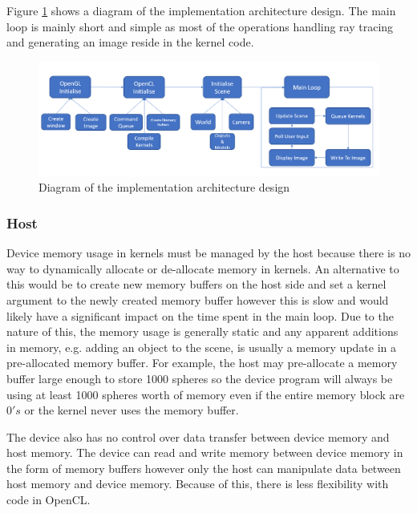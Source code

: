 \documentclass[final]{cmpreport}
\begin{document}
Figure \ref{arch_design} shows a diagram of the implementation architecture design. The main loop is mainly short and simple as most of the operations handling ray tracing and generating an image reside in the kernel code.

\begin{figure}
    \centering
    \includegraphics[width=\textwidth]{img/architecture_diagram.png}
    \caption{Diagram of the implementation architecture design}
    \label{arch_design}
\end{figure}

\subsubsection{Host}

Device memory usage in kernels must be managed by the host because there is no way to dynamically allocate or de-allocate memory in kernels. An alternative to this would be to create new memory buffers on the host side and set a kernel argument to the newly created memory buffer however this is slow and would likely have a significant impact on the time spent in the main loop. Due to the nature of this, the memory usage is generally static and any apparent additions in memory, e.g. adding an object to the scene, is usually a memory update in a pre-allocated memory buffer. For example, the host may pre-allocate a memory buffer large enough to store 1000 spheres so the device program will always be using at least 1000 spheres worth of memory even if the entire memory block are $0's$ or the kernel never uses the memory buffer.

The device also has no control over data transfer between device memory and host memory. The device can read and write memory between device memory in the form of memory buffers however only the host can manipulate data between host memory and device memory. Because of this, there is less flexibility with code in OpenCL.
\end{document}
